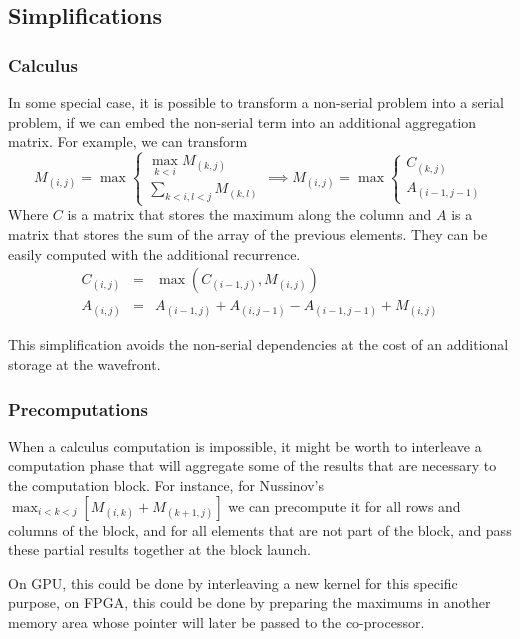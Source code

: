 \documentclass[11pt]{article}
\begin{document}
\subsection{Simplifications}
\subsubsection{Calculus}
In some special case, it is possible to transform a non-serial problem into a serial problem, if we can embed the non-serial term into an additional aggregation matrix. For example, we can transform
	\[M_{(i,j)}=\max\left\{\begin{array}{l} \max\limits_{k<i} M_{(k,j)}
	\\ \sum\limits_{k<i, l<j}M_{(k,l)} \end{array}\right.
	\implies M_{(i,j)}=\max\left\{\begin{array}{l} C_{(k,j)} \\ A_{(i-1,j-1)} \end{array}\right.\]
Where $C$ is a matrix that stores the maximum along the column and $A$ is a matrix that stores the sum of the array of the previous elements. They can be easily computed with the additional recurrence.
	\[\begin{array}{rcl} C_{(i,j)}&=&\max(C_{(i-1,j)}, M_{(i,j)}) \\
	A_{(i,j)}&=&A_{(i-1,j)}+A_{(i,j-1)}-A_{(i-1,j-1)}+M_{(i,j)}\end{array}\]

This simplification avoids the non-serial dependencies at the cost of an additional storage at the wavefront.

\subsubsection{Precomputations}
When a calculus computation is impossible, it might be worth to interleave a computation phase that will aggregate some of the results that are necessary to the computation block. For instance, for Nussinov's $\max_{i<k<j} [ M_{(i,k)}+M_{(k+1,j)} ]$ we can precompute it for all rows and columns of the block, and for all elements that are not part of the block, and pass these partial results together at the block launch.

On GPU, this could be done by interleaving a new kernel for this specific purpose, on FPGA, this could be done by preparing the maximums in another memory area whose pointer will later be passed to the co-processor.
\end{document}
